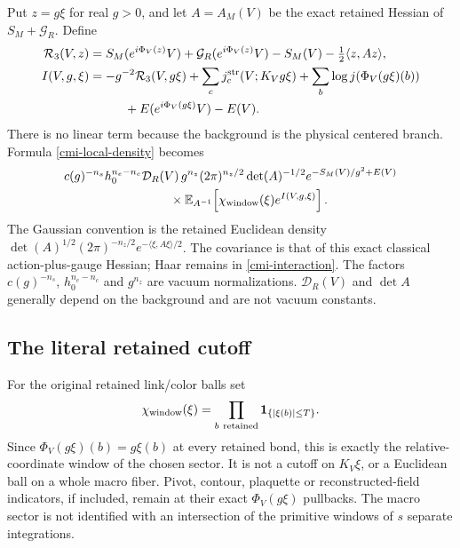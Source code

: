 Put $z=g\xi$ for real $g>0$, and let $A=A_M(V)$ be the exact
retained Hessian of $S_M+\mathcal G_R$. Define
\begin{align}
 \mathcal R_3(V,z)
   &=S_M(e^{i\Phi_V(z)}V)+\mathcal G_R(e^{i\Phi_V(z)}V)
            -S_M(V)-\tfrac12\langle z,Az\rangle,\notag\\
 I(V,g,\xi)
   &=-g^{-2}\mathcal R_3(V,g\xi)
      +\sum_cj_c^{\rm str}(V;K_Vg\xi)
      +\sum_b\log j(\Phi_V(g\xi)(b))\notag\\
   &\hspace{1cm}+E(e^{i\Phi_V(g\xi)}V)-E(V).
                                                        \label{cmi-interaction}
\end{align}
There is no linear term because the background is the physical
centered branch. Formula \eqref{cmi-local-density} becomes
\begin{align}
 &c(g)^{-n_s}h_0^{n_e-n_c}\mathcal D_R(V)\,
   g^{n_z}(2\pi)^{n_z/2}\det(A)^{-1/2}
   e^{-S_M(V)/g^2+E(V)}\notag\\
 &\hspace{3cm}\times
   \mathbb E_{A^{-1}}\!
      \left[\chi_{\rm window}(\xi)e^{I(V,g,\xi)}\right].
                                                        \label{cmi-Gaussian-integral}
\end{align}
The Gaussian convention is the retained Euclidean density
$\det(A)^{1/2}(2\pi)^{-n_z/2}
e^{-\langle\xi,A\xi\rangle/2}$.
The covariance is that of this exact classical
action-plus-gauge Hessian; Haar remains in
\eqref{cmi-interaction}. The factors $c(g)^{-n_s}$,
$h_0^{n_e-n_c}$ and $g^{n_z}$ are vacuum normalizations.
$\mathcal D_R(V)$ and $\det A$ generally depend on the
background and are not vacuum constants.

\subsection{The literal retained cutoff}
\label{cmi-window-section}

For the original retained link/color balls set
\[
 \chi_{\rm window}(\xi)=
 \prod_{b\ {\rm retained}}\mathbf1_{\{|\xi(b)|\le T\}}.
\]
Since $\Phi_V(g\xi)(b)=g\xi(b)$ at every retained bond,
this is exactly the relative-coordinate window of the
chosen sector. It is not a cutoff on $K_V\xi$, or a
Euclidean ball on a whole macro fiber. Pivot, contour,
plaquette or reconstructed-field indicators, if included,
remain at their exact $\Phi_V(g\xi)$ pullbacks.
The macro sector is not identified with an intersection
of the primitive windows of $s$ separate integrations.

